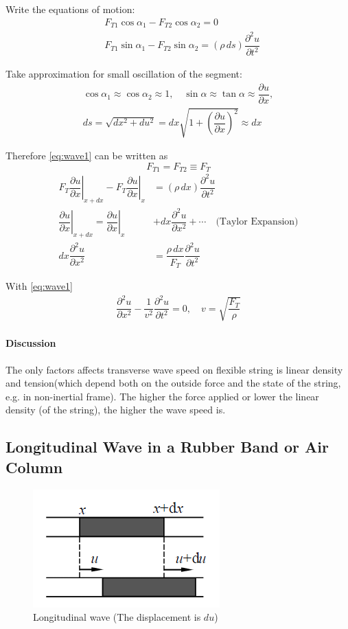 \documentclass[11pt, a4paper, oneside]{book}
\def\D{\partial}
\numberwithin{equation}{section}%
\begin{document}
Write the equations of motion:
\begin{align}
	&F_{T1}\cos \alpha_1 - F_{T2}\cos \alpha_2 = 0\\
	&F_{T1}\sin \alpha_1 - F_{T2}\sin \alpha_2 = (\rho\,ds)\dfrac{\D^2u}{\D t^2}\label{eq:wave1}
\end{align}

Take approximation for small oscillation of the segment:
\begin{align}
	\cos\alpha_1 \approx \cos\alpha_2 \approx 1, \quad \sin\alpha \approx \tan\alpha \approx \dfrac{\D u}{\D x}, \\ 
	ds = \sqrt{dx^2 + du^2} = dx\sqrt{1+\left(\dfrac{\D u}{\D x}\right)^2} \approx dx
\end{align}

Therefore \ref{eq:wave1} can be written as
	$$F_{T1} = F_{T2} \equiv F_{T}$$
\begin{align}
	F_{T}\left.\dfrac{\D u}{\D x}\right|_{x+dx} - \left.F_{T}\dfrac{\D u}{\D x}\right|_{x} &= (\rho\,dx)\dfrac{\D^2u}{\D t^2}\\
	\left.\dfrac{\D u}{\D x}\right|_{x+dx} = \left.\dfrac{\D u}{\D x}\right|_{x} &+ dx\dfrac{\D^2u}{\D x^2} + \cdots\quad\text{(Taylor Expansion)}\\
	dx\dfrac{\D^2u}{\D x^2} &= \dfrac{\rho\,dx}{F_T}\dfrac{\D^2u}{\D t^2}
\end{align}

With \ref{eq:wave1}
\begin{align}
	\dfrac{\D^2 u}{\D x^2} - \dfrac{1}{v^2}\dfrac{\D^2u}{\D t^2} = 0,\quad v = \sqrt{\dfrac{F_T}{\rho}}
\end{align}

\paragraph{Discussion}
The only factors affects transverse wave speed on flexible string is linear density and tension(which depend both on the outside force and the state of the string, e.g. in non-inertial frame). The higher the force applied or lower the linear density (of the string), the higher the wave speed is. 
\subsection{Longitudinal Wave in a Rubber Band or Air Column}
\begin{figure}[H]
	\centering
	\includegraphics[width=0.4\linewidth]{Longitudinal}
	\caption{Longitudinal wave (The displacement is $du$)}
	\label{fig:longitudinal}
\end{figure}
\end{document}
